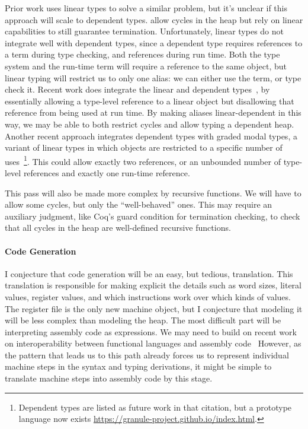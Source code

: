 Prior work uses linear types to solve a similar problem, but it's unclear if
this approach will scale to dependent types.
\citet{ahmed2007:l3} allow cycles in the heap but rely on linear capabilities to
still guarantee termination.
Unfortunately, linear types do not integrate well with dependent types, since a
dependent type requires references to a term during type checking, and
references during run time.
Both the type system and the run-time term will require a reference to the same
object, but linear typing will restrict us to only one alias: we can either use
the term, or type check it.
Recent work does integrate the linear and dependent types~\cite{mcbride2016},
by essentially allowing a type-level reference to a linear object but
disallowing that reference from being used at run time.
By making aliases linear-dependent in this way, we may be able to both restrict
cycles and allow typing a dependent heap.
Another recent approach integrates dependent types with graded modal types, a
variant of linear types in which objects are restricted to a specific number of
uses~\cite{orchard2017}\footnote{Dependent types are listed as future work in
  that citation, but a prototype language now exists
  \url{https://granule-project.github.io/index.html}.}.
This could allow exactly two references, or an unbounded number of type-level
references and exactly one run-time reference.

This pass will also be made more complex by recursive functions.
We will have to allow some cycles, but only the ``well-behaved'' ones.
This may require an auxiliary judgment, like Coq's guard condition for
termination checking, to check that all cycles in the heap are well-defined
recursive functions.

\paragraph{Code Generation}
I conjecture that code generation will be an easy, but tedious,
translation.
This translation is responsible for making explicit the details such as word
sizes, literal values, register values, and which instructions work over which
kinds of values.
The register file is the only new machine object, but I conjecture that
modeling it will be less complex than modeling the heap.
The most difficult part will be interpreting assembly code as expressions.
We may need to build on recent work on interoperability between functional
languages and assembly code~\cite{patterson2017:funtal}
However, as the pattern that leads us to this path already forces us to
represent individual machine steps in the syntax and typing derivations, it
might be simple to translate machine steps into assembly code by this stage.

